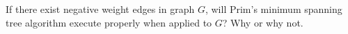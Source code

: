 If there exist negative weight edges in graph $G$, will Prim's minimum
spanning tree algorithm execute properly when applied to $G$?  Why or
why not.
